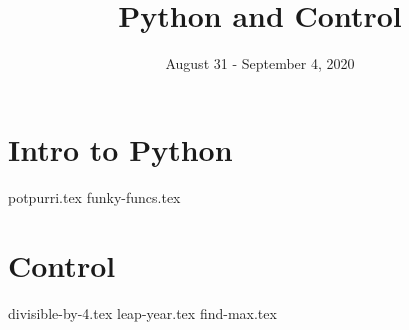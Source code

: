 \documentclass{exam}
\title{Python and Control}
\date{August 31 - September 4, 2020}
\begin{document}
\maketitle

\section{Intro to Python}
\begin{questions}
{potpurri.tex}
{funky-funcs.tex}
\end{questions}

\section{Control}
\begin{questions}
{divisible-by-4.tex}
{leap-year.tex}
{find-max.tex}
\end{questions}
\end{document}
